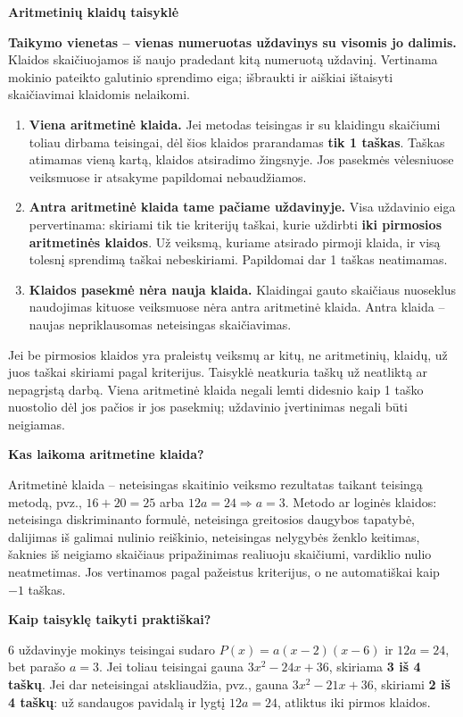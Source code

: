 \documentclass[11pt]{article}
\newcommand{\sk}[1]{\par\medskip\textbf{#1}\par}
\begin{document}
\sk{Aritmetinių klaidų taisyklė}
\textbf{Taikymo vienetas -- vienas numeruotas uždavinys su visomis jo dalimis.} Klaidos skaičiuojamos iš naujo pradedant kitą numeruotą uždavinį. Vertinama mokinio pateikto galutinio sprendimo eiga; išbraukti ir aiškiai ištaisyti skaičiavimai klaidomis nelaikomi.
\begin{enumerate}
\item \textbf{Viena aritmetinė klaida.} Jei metodas teisingas ir su klaidingu skaičiumi toliau dirbama teisingai, dėl šios klaidos prarandamas \textbf{tik 1 taškas}. Taškas atimamas vieną kartą, klaidos atsiradimo žingsnyje. Jos pasekmės vėlesniuose veiksmuose ir atsakyme papildomai nebaudžiamos.
\item \textbf{Antra aritmetinė klaida tame pačiame uždavinyje.} Visa uždavinio eiga pervertinama: skiriami tik tie kriterijų taškai, kurie uždirbti \textbf{iki pirmosios aritmetinės klaidos}. Už veiksmą, kuriame atsirado pirmoji klaida, ir visą tolesnį sprendimą taškai nebeskiriami. Papildomai dar 1 taškas neatimamas.
\item \textbf{Klaidos pasekmė nėra nauja klaida.} Klaidingai gauto skaičiaus nuoseklus naudojimas kituose veiksmuose nėra antra aritmetinė klaida. Antra klaida -- naujas nepriklausomas neteisingas skaičiavimas.
\end{enumerate}
Jei be pirmosios klaidos yra praleistų veiksmų ar kitų, ne aritmetinių, klaidų, už juos taškai skiriami pagal kriterijus. Taisyklė neatkuria taškų už neatliktą ar nepagrįstą darbą. Viena aritmetinė klaida negali lemti didesnio kaip 1 taško nuostolio dėl jos pačios ir jos pasekmių; uždavinio įvertinimas negali būti neigiamas.

\sk{Kas laikoma aritmetine klaida?}
Aritmetinė klaida -- neteisingas skaitinio veiksmo rezultatas taikant teisingą metodą, pvz., $16+20=25$ arba $12a=24\Rightarrow a=3$.
Metodo ar loginės klaidos: neteisinga diskriminanto formulė, neteisinga greitosios daugybos tapatybė, dalijimas iš galimai nulinio reiškinio, neteisingas nelygybės ženklo keitimas, šaknies iš neigiamo skaičiaus pripažinimas realiuoju skaičiumi, vardiklio nulio neatmetimas. Jos vertinamos pagal pažeistus kriterijus, o ne automatiškai kaip $-1$ taškas.

\sk{Kaip taisyklę taikyti praktiškai?}
6 uždavinyje mokinys teisingai sudaro $P(x)=a(x-2)(x-6)$ ir $12a=24$, bet parašo $a=3$. Jei toliau teisingai gauna $3x^2-24x+36$, skiriama \textbf{3 iš 4 taškų}. Jei dar neteisingai atskliaudžia, pvz., gauna $3x^2-21x+36$, skiriami \textbf{2 iš 4 taškų}: už sandaugos pavidalą ir lygtį $12a=24$, atliktus iki pirmos klaidos.
\end{document}
